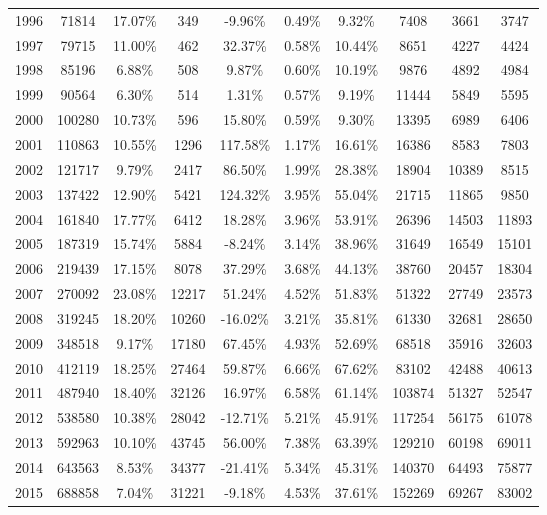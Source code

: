 \begin{table}[h]
{\begin{tabular}{@{}cccccccccc@{}}
1996 & 71814   & 17.07\% & 349   & -9.96\%   & 0.49\% & 9.32\%  & 7408   & 3661  & 3747   \\
1997 & 79715   & 11.00\% & 462   & 32.37\%   & 0.58\% & 10.44\% & 8651   & 4227  & 4424   \\
1998 & 85196   & 6.88\%  & 508   & 9.87\%    & 0.60\% & 10.19\% & 9876   & 4892  & 4984   \\
1999 & 90564   & 6.30\%  & 514   & 1.31\%    & 0.57\% & 9.19\%  & 11444  & 5849  & 5595   \\
2000 & 100280  & 10.73\% & 596   & 15.80\%   & 0.59\% & 9.30\%  & 13395  & 6989  & 6406   \\
2001 & 110863  & 10.55\% & 1296  & 117.58\%  & 1.17\% & 16.61\% & 16386  & 8583  & 7803   \\
2002 & 121717  & 9.79\%  & 2417  & 86.50\%   & 1.99\% & 28.38\% & 18904  & 10389 & 8515   \\
2003 & 137422  & 12.90\% & 5421  & 124.32\%  & 3.95\% & 55.04\% & 21715  & 11865 & 9850   \\
2004 & 161840  & 17.77\% & 6412  & 18.28\%   & 3.96\% & 53.91\% & 26396  & 14503 & 11893  \\
2005 & 187319  & 15.74\% & 5884  & -8.24\%   & 3.14\% & 38.96\% & 31649  & 16549 & 15101  \\
2006 & 219439  & 17.15\% & 8078  & 37.29\%   & 3.68\% & 44.13\% & 38760  & 20457 & 18304  \\
2007 & 270092  & 23.08\% & 12217 & 51.24\%   & 4.52\% & 51.83\% & 51322  & 27749 & 23573  \\
2008 & 319245  & 18.20\% & 10260 & -16.02\%  & 3.21\% & 35.81\% & 61330  & 32681 & 28650  \\
2009 & 348518  & 9.17\%  & 17180 & 67.45\%   & 4.93\% & 52.69\% & 68518  & 35916 & 32603  \\
2010 & 412119  & 18.25\% & 27464 & 59.87\%   & 6.66\% & 67.62\% & 83102  & 42488 & 40613  \\
2011 & 487940  & 18.40\% & 32126 & 16.97\%   & 6.58\% & 61.14\% & 103874 & 51327 & 52547  \\
2012 & 538580  & 10.38\% & 28042 & -12.71\%  & 5.21\% & 45.91\% & 117254 & 56175 & 61078  \\
2013 & 592963  & 10.10\% & 43745 & 56.00\%   & 7.38\% & 63.39\% & 129210 & 60198 & 69011  \\
2014 & 643563  & 8.53\%  & 34377 & -21.41\%  & 5.34\% & 45.31\% & 140370 & 64493 & 75877  \\
2015 & 688858  & 7.04\%  & 31221 & -9.18\%   & 4.53\% & 37.61\% & 152269 & 69267 & 83002  \\

\end{tabular}}
\end{table}
